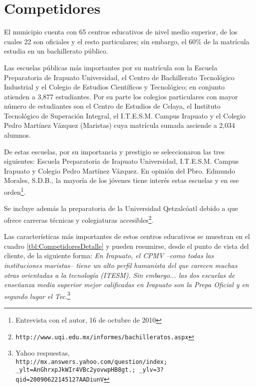 \section{Competidores}
\label{sec:Neg:Competidores}

El municipio cuenta con 65 centros educativos de nivel medio superior, de los cuales 22 son oficiales y el resto particulares; sin embargo, el 60\% de la matrícula estudia en un bachillerato público.

Las escuelas públicas más importantes por su matrícula son la Escuela Preparatoria de Irapuato Universidad, el Centro de Bachillerato Tecnol\'ogico Industrial y el Colegio de Estudios Cient\'ificos y Tecnol\'ogico;
 en conjunto atienden a 3,877 estudiantes. Por su parte los colegios particulares con mayor número de estudiantes son el Centro de Estudios de Celaya, el Instituto Tecnol\'ogico de Superaci\'on Integral, el I.T.E.S.M. Campus Irapuato y el Colegio Pedro Mart\'inez V\'azquez (Maristas) cuya matrícula sumada asciende a 2,034 alumnos.

De estas escuelas, por su importancia y prestigio se seleccionaron las tres siguientes: Escuela Preparatoria de Irapuato Universidad, I.T.E.S.M. Campus Irapuato y Colegio Pedro Mart\'inez V\'azquez. En opini\'on del Pbro. Edmundo Morales, S.D.B., la mayoría de los jóvenes tiene interés estas escuelas y en ese orden\footnote{Entrevista con el autor, 16 de octubre de 2010}.

Se incluye además la preparatoria de la Universidad Qetzalcóatl debido a que ofrece carreras técnicas y colegiaturas accesibles\footnote{\texttt{http://www.uqi.edu.mx/informes/bachilleratos.aspx}}.

Las características m\'as importantes de estos centros educativos se muestran en el cuadro \ref{tbl:CompetidoresDetalle} y pueden resumirse, desde el punto de vista del cliente, de la siguiente forma: \emph{En Irapuato, el CPMV --como todas las instituciones maristas-- tiene un alto perfil humanista del que carecen muchas otras orientadas a la tecnología (ITESM). Sin embargo... las dos escuelas de enseñanza media superior mejor calificadas en Irapuato son la Prepa Oficial y en segundo lugar el Tec.}\footnote{Yahoo respuestas,\\
\texttt{http://mx.answers.yahoo.com/question/index; \_ylt=AnGhrxpJkWIr4VBc2yovwpHB8gt.; \_ylv=3?qid=20090622145127AADiunV}}





